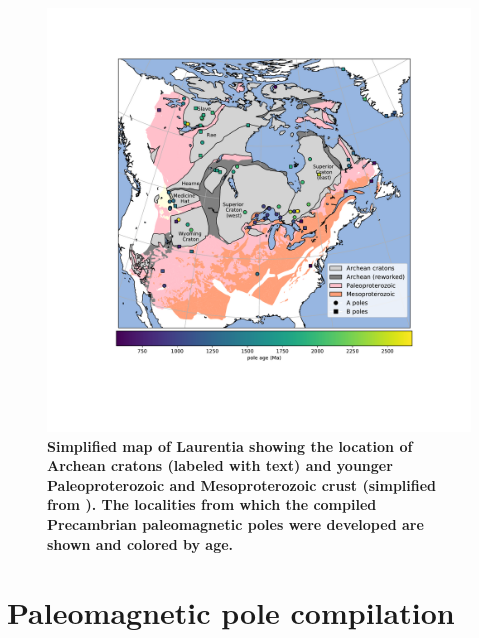 \documentclass[11pt,letterpaper]{article}
\begin{document}

\begin{figure}
\centering
\includegraphics[width=6.5 in]{Figures/Fig1_map.pdf}
\caption{\small{\textbf{Simplified map of Laurentia showing the location of Archean cratons (labeled with text) and younger Paleoproterozoic and Mesoproterozoic crust (simplified from \cite{Whitmeyer2007a}). The localities from which the compiled Precambrian paleomagnetic poles were developed are shown and colored by age.}}}
\label{fig:Laurentia_map}
\end{figure}

\section{Paleomagnetic pole compilation}
\end{document}
